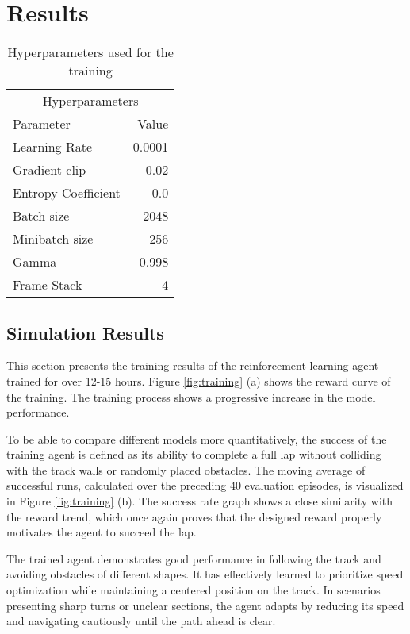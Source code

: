 \documentclass[a4paper, 10pt]{LTJournalArticle}
\begin{document}

\section{Results}



\begin{table}[!b] %
	\caption{Hyperparameters used for the training}
	\centering
	\begin{tabular}{l r}
		\toprule
		\multicolumn{2}{c}{Hyperparameters} \\
		\cmidrule(r){1-2}
		Parameter  & Value \\
		\midrule
		Learning Rate  & 0.0001 \\
		Gradient clip  & 0.02 \\
        Entropy Coefficient & 0.0 \\
        Batch size  & 2048 \\
        Minibatch size & 256 \\
        Gamma & 0.998 \\
        Frame Stack & 4 \\
		\bottomrule
	\end{tabular}
	\label{tab:hyperparameters}
\end{table}



\subsection{Simulation Results}
This section presents the training results of the reinforcement learning agent trained for over 12-15 hours. Figure \ref{fig:training} (a) shows the reward curve of the training. The training process shows a progressive increase in the model performance.

To be able to compare different models more quantitatively, the success of the training agent is defined as its ability to complete a full lap without colliding with the track walls or randomly placed obstacles. The moving average of successful runs, calculated over the preceding 40 evaluation episodes, is visualized in Figure \ref{fig:training} (b). The success rate graph shows a close similarity with the reward trend, which once again proves that the designed reward properly motivates the agent to succeed the lap.



The trained agent demonstrates good performance in following the track and avoiding obstacles of different shapes. It has effectively learned to prioritize speed optimization while maintaining a centered position on the track. In scenarios presenting sharp turns or unclear sections, the agent adapts by reducing its speed and navigating cautiously until the path ahead is clear.
\end{document}
